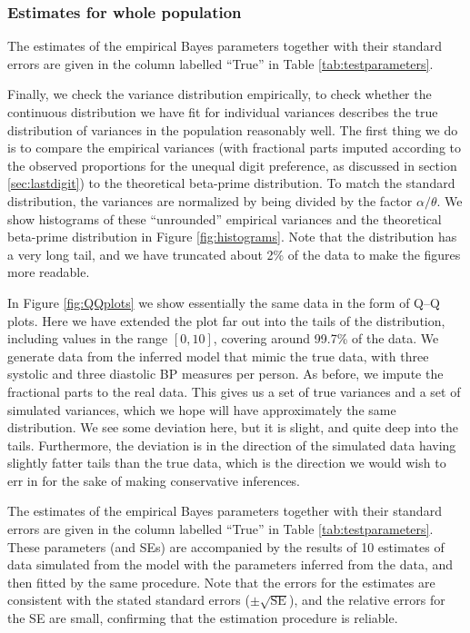 \documentclass[
]{article}
\begin{document}
\hypertarget{estimates-for-whole-population}{%
\subsubsection{Estimates for whole population}\label{estimates-for-whole-population}}

The estimates of the empirical Bayes parameters together with their standard errors are given in the column labelled ``True'' in Table \ref{tab:testparameters}.

Finally, we check the variance distribution empirically, to check whether the continuous distribution we have fit for individual variances describes the true distribution of variances in the population reasonably well.
The first thing we do is to compare the empirical
variances (with fractional parts imputed according to the observed proportions for the unequal digit preference, as discussed in section \ref{sec:lastdigit}) to the theoretical beta-prime distribution.
To match the standard distribution, the variances are normalized by being divided by the factor \(\alpha/\theta\).
We show histograms of these ``unrounded'' empirical variances and the theoretical beta-prime distribution in Figure \ref{fig:histograms}.
Note that the distribution has a very long tail, and we have truncated about 2\% of the data to make the figures more readable.

In Figure \ref{fig:QQplots} we show essentially the same data in the form of Q--Q plots.
Here we have extended the plot far out into the tails of the distribution, including values in the range \([0,10]\), covering around 99.7\% of the data.
We generate data from the inferred model that mimic the true data, with three systolic and three diastolic BP measures per person.
As before, we impute the fractional parts to the real data.
This gives us a set of true variances and a set of simulated variances, which we hope will have approximately the same distribution.
We see some deviation here, but it is slight, and quite deep into the tails.
Furthermore, the deviation is in the direction of the simulated data having slightly fatter tails than the true data, which is the direction we would wish to err in for the sake of making conservative inferences.

The estimates of the empirical Bayes parameters together with their standard errors are given in the column labelled ``True'' in Table \ref{tab:testparameters}.
These parameters (and SEs) are accompanied by the results of 10 estimates of data simulated from the model with the parameters inferred from the data, and then fitted by the same procedure.
Note that the errors for the estimates are consistent with the stated standard errors (\(\pm \sqrt{\operatorname{SE}}\)), and the relative errors for the SE are small, confirming that the estimation procedure is reliable.
\end{document}
